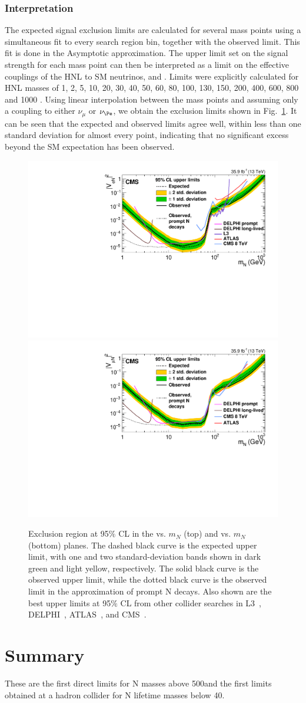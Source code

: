 \subsubsection{Interpretation}
 The expected signal exclusion limits are calculated for
 several mass points using a simultaneous fit to every search region
 bin, together with the observed limit. This fit is done in the
 Asymptotic approximation. The upper limit set on the signal strength
 for each mass point can then be interpreted as a
 limit on the effective couplings of the HNL to SM neutrinos, \mixpare
 and \mixparm. Limits were explicitly calculated for HNL masses of 1, 2, 5, 10, 20, 30, 40, 50, 60, 80, 100,
 130, 150, 200, 400, 600, 800 and 1000 \GeV. Using linear
 interpolation between the mass points and assuming only a coupling to either $\nu_{\mu}$ or $\nu_{\Pe}$,
 we obtain the exclusion limits shown in Fig.~\ref{fig:limits}. It can be seen that the expected and
 observed limits agree well, within less than one standard deviation
 for almost every point, indicating that no significant excess beyond
 the SM expectation has been observed. 
\begin{figure}[h]
\centering
\includegraphics[width=.65\textwidth]{Figures/c5/limits/CMS-EXO-17-012_Figure_002-a.pdf}\\
\includegraphics[width=.65\textwidth]{Figures/c5/limits/CMS-EXO-17-012_Figure_002-b.pdf}
\caption{Exclusion region at 95$\%$ CL in the \mixpare vs. $m_N$ (top) and \mixparm vs. $m_N$ (bottom) planes.
The dashed black curve is the expected upper limit, with one and two standard-deviation
bands shown in dark green and light yellow, respectively. The solid black curve is the observed
upper limit, while the dotted black curve is the observed limit in the approximation of
prompt N decays. Also shown are the best upper limits at 95$\%$ CL from other collider searches
in L3~\cite{ACHARD200167}, DELPHI~\cite{Abreu:1996pa}, ATLAS~\cite{Aad_2015}, and CMS~\cite{Sirunyan:2018xiv}. \willem}
\label{fig:limits}
\end{figure}

\section{Summary}
These are the first direct limits for N
masses above 500\GeV and the first
limits obtained at a hadron collider for N
lifetime masses below 40\GeV.
